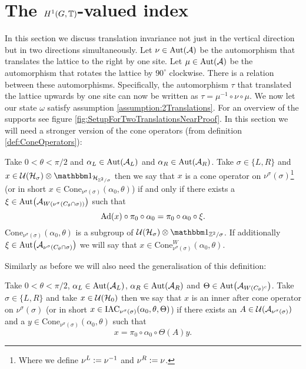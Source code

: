 \documentclass[11pt,a4paper,twoside]{article}
\numberwithin{equation}{section}
\begin{document}
\section{The $H^1(G,\mathbb T)$-valued index}\label{sec:TwoDirectionTraslationInvariance}
In this section we discuss translation invariance not just in the vertical direction but in two directions simultaneously. Let $\nu\in\Aut{\AA}$ be the automorphism that translates the lattice to the right by one site. Let $\mu\in\Aut{\AA}$ be the automorphism that rotates the lattice by $90^\circ$ clockwise. There is a relation between these automorphisms. Specifically, the automorphism $\tau$ that translated the lattice upwards by one site can now be written as $\tau=\mu^{-1}\circ\nu\circ\mu$. We now let our state $\omega$ satisfy assumption \ref{assumption:2Translations}. For an overview of the supports see figure \ref{fig:SetupForTwoTranslationsNearProof}. In this section we will need a stronger version of the cone operators (from definition \ref{def:ConeOperators}):
\begin{definition}
	Take $0<\theta<\pi/2$ and $\alpha_L\in\Aut{\AA_{L}}$ and $\alpha_R\in\Aut{\AA_{R}}$. Take $\sigma\in\{L,R\}$ and $x\in\UU(\HH_{\sigma})\otimes\id_{\HH_{\ZZ^2/\sigma}}$ then we say that $x$ is a cone operator on $\nu^\sigma(\sigma)$\footnote{Where we define $\nu^L\vcentcolon= \nu^{-1}$ and $\nu^R\vcentcolon= \nu$.} (or in short $x\in\textrm{Cone}_{\nu^\sigma(\sigma)}(\alpha_0,\theta)$) if and only if there exists a $\xi\in\Aut{\AA_{W(\nu^\sigma(C_\theta\cap\sigma))}}$ such that
	\begin{equation}
		\Ad{x}\circ\pi_0\circ\alpha_0=\pi_0\circ\alpha_0\circ\xi.
	\end{equation}
	$\textrm{Cone}_{\nu^\sigma(\sigma)}(\alpha_0,\theta)$ is a subgroup of $\UU(\HH_\sigma)\otimes\id_{\ZZ^2/\sigma}$. If additionally $\xi\in\Aut{\AA_{\nu^\sigma(C_\theta\cap\sigma)}}$ we will say that $x\in\textrm{Cone}_{\nu^\sigma(\sigma)}^W(\alpha_0,\theta)$.
\end{definition}
Similarly as before we will also need the generalisation of this definition:
\begin{definition}
	Take $0<\theta<\pi/2$, $\alpha_L\in\Aut{\AA_{L}}$, $\alpha_R\in\Aut{\AA_{R}}$ and $\Theta\in\Aut{\AA_{W(C_\theta)^c}}$. Take $\sigma\in\{L,R\}$ and take $x\in\mathcal U(\mathcal H_0)$ then we say that $x$ is an inner after cone operator on $\nu^\sigma(\sigma)$ (or in short $x\in \textrm{IAC}_{\nu^\sigma(\sigma)}(\alpha_0,\theta,\Theta)$) if there exists an $A\in\mathcal U(\mathcal A_{\nu^\sigma(\sigma)})$ and a $y\in\textrm{Cone}_{\nu^\sigma(\sigma)}(\alpha_0,\theta)$ such that
	\begin{equation}
		x=\pi_0\circ\alpha_0\circ\Theta(A)y.
	\end{equation}
\end{definition}
\end{document}
